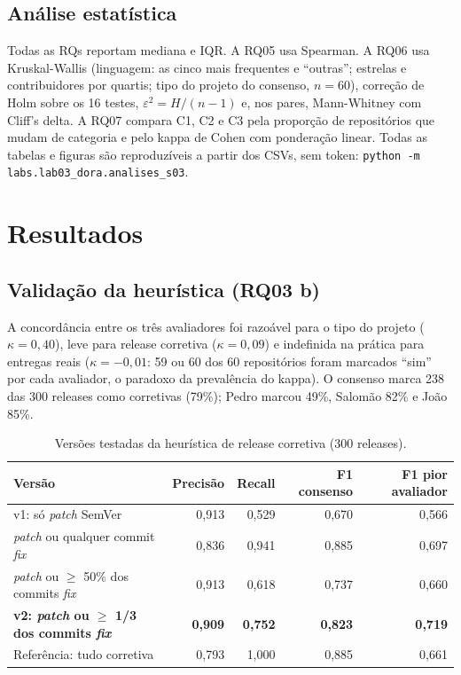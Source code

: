 \documentclass[12pt]{article}
\begin{document}
\subsection{Análise estatística}

Todas as RQs reportam mediana e IQR. A RQ05 usa Spearman. A RQ06 usa Kruskal-Wallis (linguagem: as cinco mais frequentes e ``outras''; estrelas e contribuidores por quartis; tipo do projeto do consenso, $n = 60$), correção de Holm sobre os 16 testes, $\varepsilon^2 = H/(n-1)$ e, nos pares, Mann-Whitney com Cliff's delta. A RQ07 compara C1, C2 e C3 pela proporção de repositórios que mudam de categoria e pelo kappa de Cohen com ponderação linear. Todas as tabelas e figuras são reproduzíveis a partir dos CSVs, sem token: \texttt{python -m labs.lab03\_dora.analises\_s03}.

\section{Resultados}

\subsection{Validação da heurística (RQ03 b)}

A concordância entre os três avaliadores foi razoável para o tipo do projeto ($\kappa = 0{,}40$), leve para release corretiva ($\kappa = 0{,}09$) e indefinida na prática para entregas reais ($\kappa = -0{,}01$: 59 ou 60 dos 60 repositórios foram marcados ``sim'' por cada avaliador, o paradoxo da prevalência do kappa). O consenso marca 238 das 300 releases como corretivas (79\%); Pedro marcou 49\%, Salomão 82\% e João 85\%.

\begin{table}[ht]
\centering
\caption{Versões testadas da heurística de release corretiva (300 releases).}\label{tab:heuristica}
\small
\begin{tabular}{lrrrr}
\toprule
Versão & Precisão & Recall & F1 consenso & F1 pior avaliador \\
\midrule
v1: só \textit{patch} SemVer & 0,913 & 0,529 & 0,670 & 0,566 \\
\textit{patch} ou qualquer commit \textit{fix} & 0,836 & 0,941 & 0,885 & 0,697 \\
\textit{patch} ou $\ge$ 50\% dos commits \textit{fix} & 0,913 & 0,618 & 0,737 & 0,660 \\
\textbf{v2: \textit{patch} ou $\ge$ 1/3 dos commits \textit{fix}} & \textbf{0,909} & \textbf{0,752} & \textbf{0,823} & \textbf{0,719} \\
Referência: tudo corretiva & 0,793 & 1,000 & 0,885 & 0,661 \\
\bottomrule
\end{tabular}
\end{table}
\end{document}
